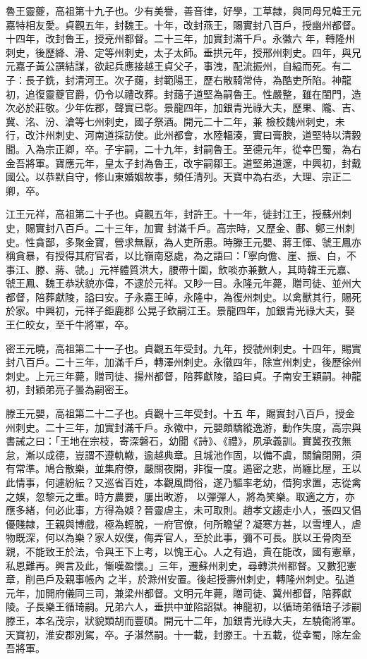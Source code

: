 \begin{pinyinscope}
 魯王靈夔，高祖第十九子也。少有美譽，善音律，好學，工草隸，與同母兄韓王元嘉特相友愛。貞觀五年，封魏王。十年，改封燕王，賜實封八百戶，授幽州都督。十四年，改封魯王，授兗州都督。二十三年，加實封滿千戶。永徽六
 年，轉隆州刺史，後歷絳、滑、定等州刺史，太子太師。垂拱元年，授邢州刺史。四年，與兄元嘉子黃公譔結謀，欲起兵應接越王貞父子，事洩，配流振州，自縊而死。有二子：長子銑，封清河王。次子藹，封範陽王，歷右散騎常侍，為酷吏所陷。神龍初，追復靈夔官爵，仍令以禮改葬。封藹子道堅為嗣魯王。性嚴整，雖在閨門，造次必於莊敬。少年佐郡，聲實已彰。景龍四年，加銀青光祿大夫，歷果、隴、吉、冀、洺、汾、滄等七州刺史，國子祭酒。開元二十二年，兼
 檢校魏州刺史，未行，改汴州刺史、河南道採訪使。此州都會，水陸輻湊，實曰膏腴，道堅特以清毅聞。入為宗正卿，卒。子宇嗣，二十九年，封嗣魯王。至德元年，從幸巴蜀，為右金吾將軍。寶應元年，皇太子封為魯王，改宇嗣鄒王。道堅弟道邃，中興初，封戴國公。以恭默自守，修山東婚姻故事，頻任清列。天寶中為右丞，大理、宗正二卿，卒。



 江王元祥，高祖第二十子也。貞觀五年，封許王。十一年，徙封江王，授蘇州刺史，賜實封八百戶。二十三年，加實
 封滿千戶。高宗時，又歷金、鄜、鄭三州刺史。性貪鄙，多聚金寶，營求無厭，為人吏所患。時滕王元嬰、蔣王惲、虢王鳳亦稱貪暴，有授得其府官者，以比嶺南惡處，為之語曰：「寧向儋、崖、振、白，不事江、滕、蔣、虢。」元祥體質洪大，腰帶十圍，飲啖亦兼數人，其時韓王元嘉、虢王鳳、魏王恭狀貌亦偉，不逮於元祥。又眇一目。永隆元年薨，贈司徒、並州大都督，陪葬獻陵，謚曰安。子永嘉王晫，永隆中，為復州刺史。以禽獸其行，賜死於家。中興初，元祥子鉅鹿郡
 公晃子欽嗣江王。景龍四年，加銀青光祿大夫，娶王仁皎女，至千牛將軍，卒。



 密王元曉，高祖第二十一子也。貞觀五年受封。九年，授虢州刺史。十四年，賜實封八百戶。二十三年，加滿千戶，轉澤州刺史。永徽四年，除宣州刺史，後歷徐州刺史。上元三年薨，贈司徒、揚州都督，陪葬獻陵，謚曰貞。子南安王穎嗣。神龍初，封穎弟亮子曇為嗣密王。



 滕王元嬰，高祖第二十二子也。貞觀十三年受封。十五
 年，賜實封八百戶，授金州刺史。二十三年，加實封滿千戶。永徽中，元嬰頗驕縱逸游，動作失度，高宗與書誡之曰：「王地在宗枝，寄深磐石，幼聞《詩》、《禮》，夙承義訓。實冀孜孜無怠，漸以成德，豈謂不遵軌轍，逾越典章。且城池作固，以備不虞，關鑰閉開，須有常準。鳩合散樂，並集府僚，嚴關夜開，非復一度。遏密之悲，尚纏比屋，王以此情事，何遽紛紜？又巡省百姓，本觀風問俗，遂乃驅率老幼，借狗求置，志從禽之娛，忽黎元之重。時方農要，屢出畋游，
 以彈彈人，將為笑樂。取適之方，亦應多緒，何必此事，方得為娛？晉靈虐主，未可取則。趙孝文趨走小人，張四又倡優賤隸，王親與博戲，極為輕脫，一府官僚，何所瞻望？凝寒方甚，以雪埋人，虐物既深，何以為樂？家人奴僕，侮弄官人，至於此事，彌不可長。朕以王骨肉至親，不能致王於法，令與王下上考，以愧王心。人之有過，貴在能改，國有憲章，私恩難再。興言及此，慚嘆盈懷。」三年，遷蘇州刺史，尋轉洪州都督。又數犯憲章，削邑戶及親事帳內
 之半，於滁州安置。後起授壽州刺史，轉隆州刺史。弘道元年，加開府儀同三司，兼梁州都督。文明元年薨，贈司徒、冀州都督，陪葬獻陵。子長樂王循琦嗣。兄弟六人，垂拱中並陷詔獄。神龍初，以循琦弟循琣子涉嗣滕王，本名茂宗，狀貌類胡而豐碩。開元十二年，加銀青光祿大夫，左驍衛將軍。天寶初，淮安郡別駕，卒。子湛然嗣。十一載，封滕王。十五載，從幸蜀，除左金吾將軍。




\end{pinyinscope}
